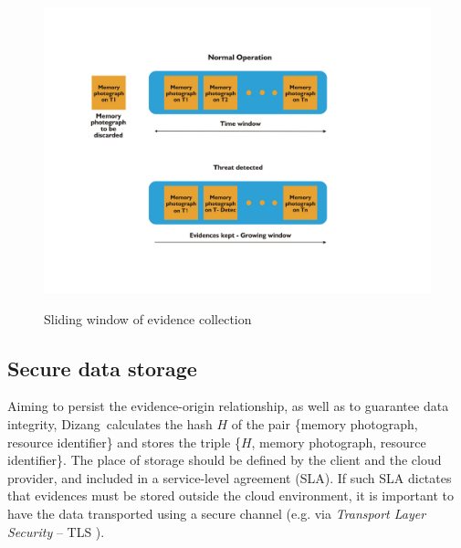 \documentclass[conference]{IEEEtran}
\newcommand{\marcos}[1]{{\color{green}{MARCOS: #1}}}
\newcommand{\fancyname}{Dizang}
\begin{document}
\begin{figure}[tb!]
\footnotesize
\caption{Sliding window of evidence collection \marcos{Essa imagem tem MUITO espaço em branco nos arredores: fica esquisito no slide... Melhor cortar esse monte de branco}}
\includegraphics[scale=0.40]{janela_ieee-eng.jpg}
\centering
\label{fig:janela}
\end{figure}



\subsection{Secure data storage}
\label{sec:proposal-desc-memcpy}


%
Aiming to persist the evidence-origin relationship, as well as to guarantee data integrity, \fancyname\ calculates the hash $H$ of the pair \{memory photograph, resource identifier\} and stores the triple \{$H$, memory photograph, resource identifier\}.
%
The place of storage should be defined by the client and the cloud provider, and included in a service-level agreement (SLA).
%
If such SLA dictates that evidences must be stored outside the cloud environment, it is important to have the data transported using a secure channel (e.g. via \textit{Transport Layer Security} – TLS \cite{DierksT2008}).

\end{document}
